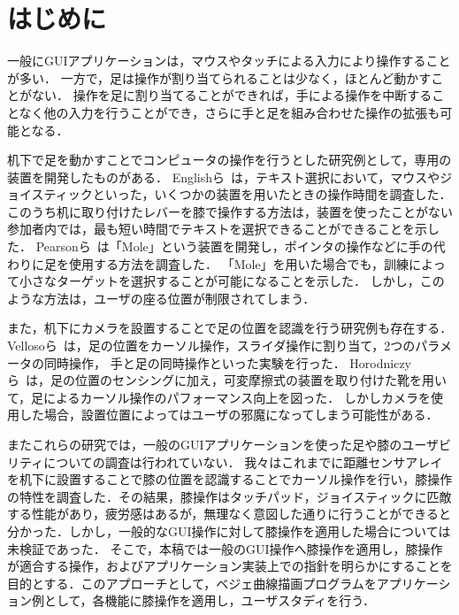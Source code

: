 \documentclass[submit, techrep]{ipsj}
\begin{document}
\section{はじめに}
一般にGUIアプリケーションは，マウスやタッチによる入力により操作することが多い．
一方で，足は操作が割り当てられることは少なく，ほとんど動かすことがない．
操作を足に割り当てることができれば，手による操作を中断することなく他の入力を行うことができ，さらに手と足を組み合わせた操作の拡張も可能となる．\par
机下で足を動かすことでコンピュータの操作を行うとした研究例として，専用の装置を開発したものがある．
Englishら~\cite{1698228}は，テキスト選択において，マウスやジョイスティックといった，いくつかの装置を用いたときの操作時間を調査した．このうち机に取り付けたレバーを膝で操作する方法は，装置を使ったことがない参加者内では，最も短い時間でテキストを選択できることができることを示した．
Pearsonら~\cite{Pearson:1986:MMD:22627.22392, Pearson:1988:EEP:57167.57169}は「Mole」という装置を開発し，ポインタの操作などに手の代わりに足を使用する方法を調査した．
「Mole」を用いた場合でも，訓練によって小さなターゲットを選択することが可能になることを示した．
しかし，このような方法は，ユーザの座る位置が制限されてしまう．\par
また，机下にカメラを設置することで足の位置を認識を行う研究例も存在する．
Vellosoら~\cite{velloso:hal-01599657}は，足の位置をカーソル操作，スライダ操作に割り当て，2つのパラメータの同時操作， 手と足の同時操作といった実験を行った．
Horodniczyら~\cite{Horodniczy:2017:FHE:3025453.3025625}は，足の位置のセンシングに加え，可変摩擦式の装置を取り付けた靴を用いて，足によるカーソル操作のパフォーマンス向上を図った．
しかしカメラを使用した場合，設置位置によってはユーザの邪魔になってしまう可能性がある．\par
またこれらの研究では，一般のGUIアプリケーションを使った足や膝のユーザビリティについての調査は行われていない．
我々はこれまでに距離センサアレイを机下に設置することで膝の位置を認識することでカーソル操作を行い，膝操作の特性を調査した．その結果，膝操作はタッチパッド，ジョイスティックに匹敵する性能があり，疲労感はあるが，無理なく意図した通りに行うことができると分かった．しかし，一般的なGUI操作に対して膝操作を適用した場合については未検証であった．
そこで，本稿では一般のGUI操作へ膝操作を適用し，膝操作が適合する操作，およびアプリケーション実装上での指針を明らかにすることを目的とする．このアプローチとして，ベジェ曲線描画プログラムをアプリケーション例として，各機能に膝操作を適用し，ユーザスタディを行う．
\end{document}
